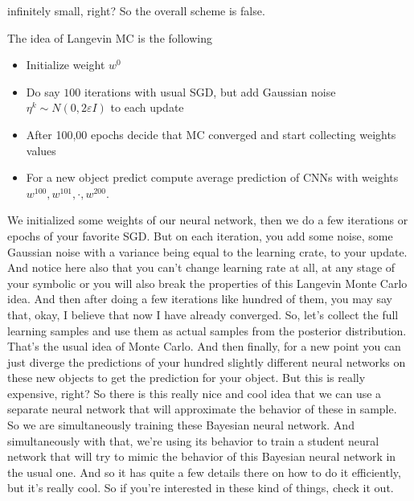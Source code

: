 \documentclass[11pt, oneside, reqno]{amsart}
\numberwithin{equation}{section}
\theoremstyle{plain}%
\theoremstyle{definition}
\theoremstyle{remark}
\begin{document}
infinitely small, right? So the overall scheme is false.

The idea of Langevin MC is the following
\begin{itemize}
	\item Initialize weight $w^0$
	\item Do say $100$ iterations with usual SGD, but add Gaussian noise $\eta^k\sim N(0,2\varepsilon I)$ to each update
	\item After 100,00 epochs decide that MC converged and start collecting weights values
	\item For a new object predict compute average prediction of CNNs with weights $w^{100}, w^{101},\cdot,w^{200}$.
\end{itemize}

 We initialized some weights of our neural network, then we do a few iterations or epochs of your favorite SGD. But on each iteration, you add some noise, some Gaussian noise with a variance being equal to the learning crate, to your update. And notice here also that you can't change learning rate at all, at any stage of your symbolic or you will also break the properties of this Langevin Monte Carlo idea. And then after doing a few iterations like hundred of them, you may say that, okay, I believe that now I have already converged. So, let's collect the full learning samples and use them as actual samples from the posterior distribution. That's the usual idea of Monte Carlo. And then finally, for a new point you can just diverge the predictions of your hundred slightly different neural networks on these new objects to get the prediction for your object. But this is really expensive, right? So there is this really nice and cool idea that we can use a separate neural network that will approximate the behavior of these in sample. So we are simultaneously training these Bayesian neural network. And simultaneously with that, we're using its behavior to train a student neural network that will try to mimic the behavior of this Bayesian neural network in the usual one. And so it has quite a few details there on how to do it efficiently, but it's really cool. So if you're interested in these kind of things, check it out.
\end{document}
